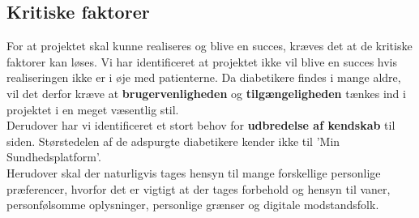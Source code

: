 \subsection{Kritiske faktorer}
For at projektet skal kunne realiseres og blive en succes, kræves det at de kritiske faktorer kan løses. Vi har identificeret at projektet ikke vil blive en succes hvis realiseringen ikke er i øje med patienterne. Da diabetikere findes i mange aldre, vil det derfor kræve at \textbf{brugervenligheden} og \textbf{tilgængeligheden} tænkes ind i projektet i en meget væsentlig stil.\\
Derudover har vi identificeret et stort behov for \textbf{udbredelse af kendskab} til siden. Størstedelen af de adspurgte diabetikere kender ikke til 'Min Sundhedsplatform'.\\
Herudover skal der naturligvis tages hensyn til mange forskellige personlige præferencer, hvorfor det er vigtigt at der tages forbehold og hensyn til vaner, personfølsomme oplysninger, personlige grænser og digitale modstandsfolk.
